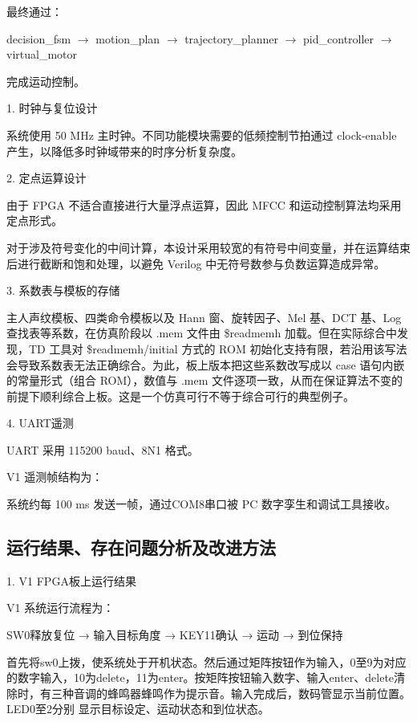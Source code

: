 \documentclass[UTF8,zihao=-4,fontset=windows]{ctexart}
\newcommand{\code}[1]{{\ttfamily #1}}
\newcommand{\subhead}[1]{%
  \par\medskip
  {\heiti\zihao{-4}#1}
  \nopagebreak
  \par\smallskip
}
\begin{document}
最终通过：
\begin{center}
\code{decision\_fsm} $\rightarrow$ \code{motion\_plan} $\rightarrow$ \code{trajectory\_planner} $\rightarrow$ \code{pid\_controller} $\rightarrow$ \code{virtual\_motor}
\end{center}
完成运动控制。

\subhead{1. 时钟与复位设计}

系统使用 50 MHz 主时钟。不同功能模块需要的低频控制节拍通过 clock-enable 产生，以降低多时钟域带来的时序分析复杂度。

\subhead{2. 定点运算设计}

由于 FPGA 不适合直接进行大量浮点运算，因此 MFCC 和运动控制算法均采用定点形式。

对于涉及符号变化的中间计算，本设计采用较宽的有符号中间变量，并在运算结束后进行截断和饱和处理，以避免 Verilog 中无符号数参与负数运算造成异常。

\subhead{3. 系数表与模板的存储}

主人声纹模板、四类命令模板以及 Hann 窗、旋转因子、Mel 基、DCT 基、Log 查找表等系数，在仿真阶段以 \code{.mem} 文件由 \code{\$readmemh} 加载。但在实际综合中发现，TD 工具对 \code{\$readmemh}/initial 方式的 ROM 初始化支持有限，若沿用该写法会导致系数表无法正确综合。为此，板上版本把这些系数改写成以 \code{case} 语句内嵌的常量形式（组合 ROM），数值与 \code{.mem} 文件逐项一致，从而在保证算法不变的前提下顺利综合上板。这是一个仿真可行不等于综合可行的典型例子。

\subhead{4. UART遥测}

UART 采用 115200 baud、8N1 格式。

V1 遥测帧结构为：
\begin{center}
\code{[AA][state][target][pos][chk]}
\end{center}
系统约每 100 ms 发送一帧，通过COM8串口被 PC 数字孪生和调试工具接收。

\subsection{运行结果、存在问题分析及改进方法}

\subhead{1. V1 FPGA板上运行结果}

V1 系统运行流程为：
\begin{center}
SW0释放复位 → 输入目标角度 → KEY11确认 → 运动 → 到位保持
\end{center}
首先将sw0上拨，使系统处于开机状态。然后通过矩阵按钮作为输入，0至9为对应的数字输入，10为delete，11为enter。按矩阵按钮输入数字、输入enter、delete清除时，有三种音调的蜂鸣器蜂鸣作为提示音。输入完成后，数码管显示当前位置。LED0至2分别 显示目标设定、运动状态和到位状态。
\end{document}
